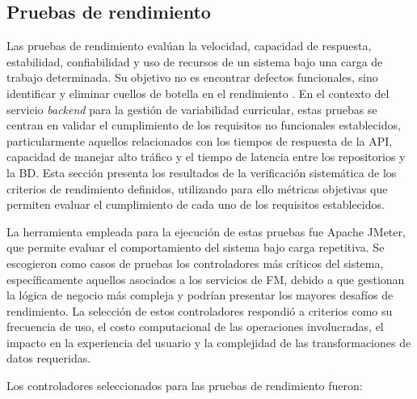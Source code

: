 \subsection{Pruebas de rendimiento}

Las pruebas de rendimiento evalúan la velocidad, capacidad de respuesta, estabilidad, confiabilidad y
uso de recursos de un sistema bajo una carga de trabajo determinada. Su objetivo no es encontrar defectos
funcionales, sino identificar y eliminar cuellos de botella en el rendimiento \citep{diaz2008}. 
En el contexto del servicio \textit{backend} para la gestión de variabilidad curricular, 
estas pruebas se centran en validar el cumplimiento de los requisitos no funcionales establecidos, particularmente 
aquellos relacionados con los tiempos de respuesta de la \ac{API}, capacidad de manejar alto tráfico y 
el tiempo de latencia entre los repositorios y la \ac{BD}. Esta sección presenta los resultados de la verificación sistemática
de los criterios de rendimiento definidos, utilizando para ello métricas objetivas que permiten evaluar el
cumplimiento de cada uno de los requisitos establecidos. 

La herramienta empleada para la ejecución de estas pruebas fue Apache JMeter, que permite evaluar el comportamiento 
del sistema bajo carga repetitiva. Se escogieron como casos de pruebas los controladores más críticos del sistema, 
específicamente aquellos asociados a los servicios de \ac{FM}, debido a que gestionan la lógica de negocio más 
compleja y podrían presentar los mayores desafíos de rendimiento. La selección de estos controladores respondió a 
criterios como su frecuencia de uso, el costo computacional de las operaciones involucradas, el impacto en la 
experiencia del usuario y la complejidad de las transformaciones de datos requeridas.

Los controladores seleccionados para las pruebas de rendimiento fueron:

